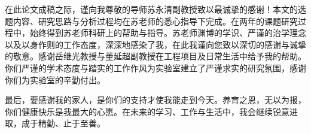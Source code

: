 
在此论文成稿之际，谨向我尊敬的导师苏永清副教授致以最诚挚的感谢！本文的选题内容、研究思路与分析过程均在苏老师的悉心指导下完成。在两年的课题研究过程中，始终得到苏老师科研上的帮助与指导。苏老师渊博的学识、严谨的治学理念以及以身作则的工作态度，深深地感染了我，在此我谨向您致以深切的感谢与诚挚的敬意。感谢岳继光教授与董延超副教授在工程项目及日常生活中给予我的帮助。你们严谨的学术态度与踏实的工作作风为实验室建立了严谨求实的研究氛围，感谢你们为实验室的辛勤付出。



最后，要感谢我的家人，是你们的支持才使我能走到今天。养育之恩，无以为报，你们健康快乐是我最大的心愿。在未来的学习、工作与生活中，我会继续锐意进取，成于精勤、止于至善。


~~\\




